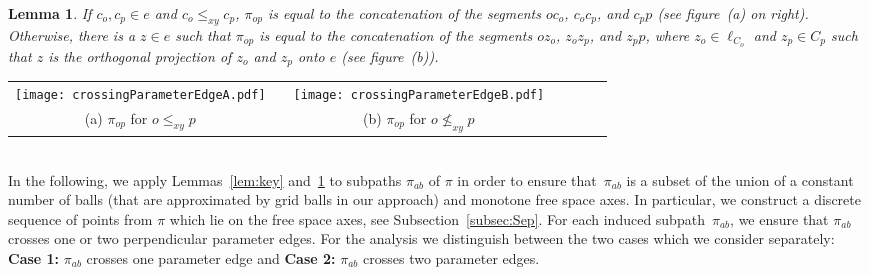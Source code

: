 \documentclass[a4paper,11pt]{article}
\newtheorem{lemma}{Lemma}
\begin{document}
\noindent\begin{minipage}{0.5\linewidth}\vspace*{0.5ex}
\begin{lemma}\label{lem:canonicalOneVertex} If $c_o,c_p \in e$ and $c_o \leq_{xy} c_p$, $\pi_{op}$ is equal to the concatenation of the segments $oc_o$, $c_oc_p$, and $c_pp$  (see figure~(a) on right). Otherwise, there is a $z \in e$ such that $\pi_{op}$ is equal to the concatenation of the segments $oz_o$, $z_oz_p$, and $z_pp$, where $z_o \in \ell_{C_o}$ and $z_p \in C_p$ such that $z$ is the orthogonal projection of $z_o$ and $z_p$ onto $e$ (see figure~(b)).
\end{lemma}
\end{minipage}
\begin{minipage}{0.4\linewidth}
\begin{center}
    \begin{tabular}{ccccccc}
      \texttt{[image: crossingParameterEdgeA.pdf]} & &
       \texttt{[image: crossingParameterEdgeB.pdf]}&&\\ 
{\small (a) $\pi_{op}$ for $o \leq_{xy} p$} & &
      {\small (b) $\pi_{op}$ for $o \nleq_{xy} p$}&&
    \end{tabular}
  \end{center}
\end{minipage} 
\\ 

In the following, we apply Lemmas~\ref{lem:key} and~\ref{lem:canonicalOneVertex} to subpaths $\pi_{ab}$ of $\pi$ in order to ensure that~$\pi_{ab}$ is a subset of the union of a constant number of balls (that are approximated by grid balls in our approach) and monotone free space axes. In particular, we construct a discrete sequence of points from $\pi$ which lie on the free space axes, see Subsection~\ref{subsec:Sep}. 
For each induced subpath~$\pi_{ab}$, we ensure that $\pi_{ab}$ crosses one or two perpendicular parameter edges. For the analysis we distinguish between the two cases which we consider separately:\\
{\bf Case 1:} $\pi_{ab}$ crosses one parameter edge and 
{\bf Case 2:} $\pi_{ab}$ crosses two parameter edges.
\end{document}
